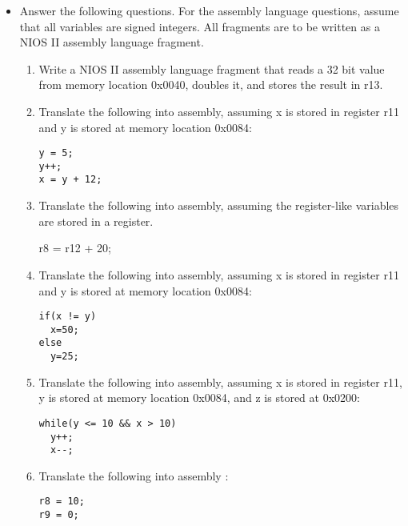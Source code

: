 \documentclass[10pt]{article}
\begin{document}
\begin{itemize}

\setlength\itemsep{10mm}


\item Answer the following questions.  For the assembly language questions, assume that all variables are signed integers.  All fragments are to be written as a NIOS II assembly language fragment.



  \begin{enumerate}
\setlength\itemsep{5mm}

\item Write a NIOS II assembly language fragment that reads a 32 bit value from memory location 0x0040, doubles it, and stores the result in r13.

    \vspace{1in}

\item Translate the following into assembly, assuming x is stored in register r11 and y is stored at memory location 0x0084:
    \begin{verbatim}
y = 5;
y++;
x = y + 12;
    \end{verbatim}
    \vspace{1in}

\item Translate the following into assembly, assuming the register-like variables are stored in a register.

r8 = r12 + 20;

    \vspace{1in}

\item Translate the following into assembly, assuming x is stored in register r11 and y is stored at memory location 0x0084:
    \begin{verbatim}
if(x != y)
  x=50;
else
  y=25;
    \end{verbatim}
    \vspace{1in}

\item Translate the following into assembly, assuming x is stored in register r11, y is stored at memory location 0x0084, and z is stored at 0x0200:
    \begin{verbatim}
while(y <= 10 && x > 10)
  y++;
  x--;
    \end{verbatim}
    \vspace{1in}


\item Translate the following into assembly :
    \begin{verbatim}
r8 = 10;
r9 = 0;


\end{verbatim}
\end{enumerate}
\end{itemize}
\end{document}
